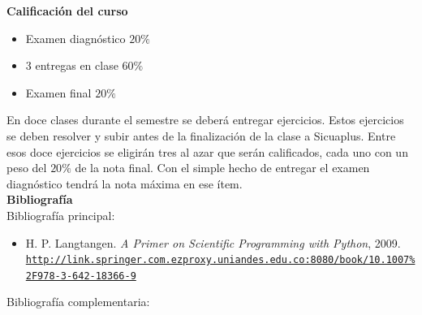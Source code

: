 \documentclass[letterpaper,10pt,onecolumn]{article}
\begin{document}
\noindent\textbf{\large {} \quad Calificaci\'on del curso}\\[-0.2cm]

\begin{itemize}
	\item Examen diagnóstico $20\%$
	\item 3 entregas en clase $60\%$
	\item Examen final $20\%$
\end{itemize}
\noindent\normalsize En doce clases durante el semestre se deberá entregar 
ejercicios. Estos ejercicios se deben resolver y subir antes de la
finalizaci\'on de la clase a Sicuaplus. Entre esos doce ejercicios se 
eligirán tres al azar que serán calificados, cada uno con un peso del $20\%$
de la nota final. Con el simple hecho de entregar el examen diagnóstico
tendrá la nota máxima en ese ítem.
\\[0.1cm] 

\noindent\textbf{\large {} \quad Bibliografía}\\[-0.2cm]

\noindent\normalsize Bibliografía principal:


\begin{itemize}
	\item H. P. Langtangen. \textit{A Primer on Scientific Programming with Python}, 2009.\\
	\href{http://link.springer.com.ezproxy.uniandes.edu.co:8080/book/10.1007\%2F978-3-642-18366-9}{\nolinkurl{http://link.springer.com.ezproxy.uniandes.edu.co:8080/book/10.1007\%2F978-3-642-18366-9}}\\[-0.6cm]
\end{itemize}

\noindent\normalsize Bibliografía complementaria:
\end{document}
